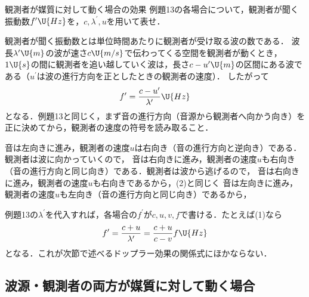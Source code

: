 \bsNeed{80mm}
\begin{reidaiunit}
\begin{reidai}{観測者が媒質に対して動く場合の効果}
\hspace{1zw}例題13の各場合について，観測者が聞く振動数$f^\prime\U{Hz}$を，$c,\lambda^\prime,u$を用いて表せ．
\end{reidai}

\begin{sisinE}
観測者が聞く振動数とは{\gtfamily 単位時間あたりに観測者が受け取る波の数}である．
波長$\lambda^\prime\U{m}$の波が速さ$c\U{m/s}$で伝わってくる空間を観測者が動くとき，$1\U{s}$の間に観測者を追い越していく波は，長さ$c-u^\prime\U{m}$の区間にある波である（$u^\prime$は{\gtfamily 波の進行方向を正としたときの観測者の速度}）．
したがって
\[f^\prime=\frac{c-u^\prime}{\lambda^\prime}\U{Hz}\]
となる．例題13と同じく，まず音の進行方向（音源から観測者へ向かう向き）を正に決めてから，観測者の速度の符号を読み取ること．
\end{sisinE}

\begin{kaitou}
\begin{komon}
 音は左向きに進み，観測者の速度$u$は右向き（音の進行方向と逆向き）である．観測者は波に向かっていくので，
 音は右向きに進み，観測者の速度$u$も右向き（音の進行方向と同じ向き）である．観測者は波から逃げるので，
 音は右向きに進み，観測者の速度$u$も右向きであるから，(2)と同じく
 音は左向きに進み，観測者の速度$u$も左向き（音の進行方向と同じ向き）であるから，
\end{komon}
\end{kaitou}
\begin{chuu}
例題13の$\lambda^\prime$を代入すれば，各場合の$f^\prime$が$c,u,v,f$で書ける．たとえば(1)なら
\[f^\prime=\frac{c+u}{\lambda^\prime}=\frac{c+u}{c-v}f\U{Hz}\]
となる．これが次節で述べるドップラー効果の関係式にほかならない．
\end{chuu}
\end{reidaiunit}

\subsection{波源・観測者の両方が媒質に対して動く場合}

